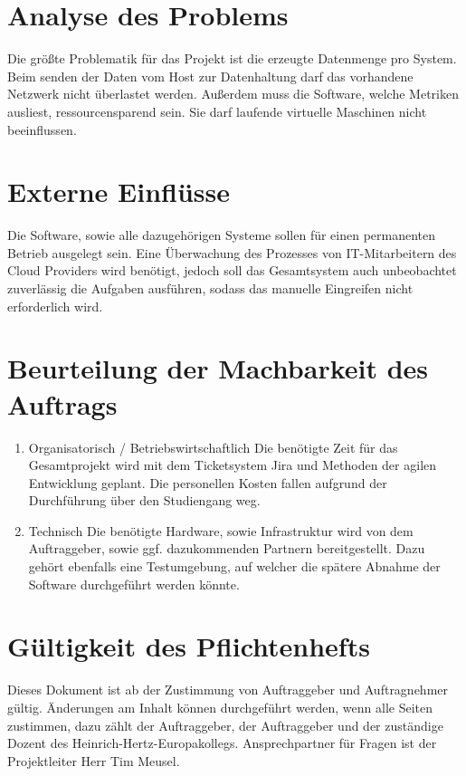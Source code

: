 \section{Analyse des Problems}

Die größte Problematik für das Projekt ist die erzeugte Datenmenge pro System.
Beim senden der Daten vom Host zur Datenhaltung darf das vorhandene Netzwerk
nicht überlastet werden. Außerdem muss die Software, welche Metriken ausliest,
ressourcensparend sein. Sie darf laufende virtuelle Maschinen nicht
beeinflussen.

\section{Externe Einflüsse}

Die Software, sowie alle dazugehörigen Systeme sollen für einen permanenten
Betrieb ausgelegt sein. Eine Überwachung des Prozesses von IT-Mitarbeitern des
Cloud Providers wird benötigt, jedoch soll das Gesamtsystem auch unbeobachtet
zuverlässig die Aufgaben ausführen, sodass das manuelle Eingreifen nicht
erforderlich wird.

\section{Beurteilung der Machbarkeit des Auftrags}

\begin{enumerate}
  \item Organisatorisch / Betriebswirtschaftlich
        Die benötigte Zeit für das Gesamtprojekt wird mit dem Ticketsystem Jira
        und Methoden der agilen Entwicklung geplant. Die personellen Kosten
        fallen aufgrund der Durchführung über den Studiengang weg.

  \item Technisch
        Die benötigte Hardware, sowie Infrastruktur wird von dem Auftraggeber,
        sowie ggf. dazukommenden Partnern bereitgestellt. Dazu gehört ebenfalls
        eine Testumgebung, auf welcher die spätere Abnahme der Software
        durchgeführt werden könnte.
\end{enumerate}

\section{Gültigkeit des Pflichtenhefts}

Dieses Dokument ist ab der Zustimmung von Auftraggeber und Auftragnehmer
gültig. Änderungen am Inhalt können durchgeführt werden, wenn alle Seiten
zustimmen, dazu zählt der Auftraggeber, der Auftraggeber und der zuständige
Dozent des Heinrich-Hertz-Europakollegs. Ansprechpartner für Fragen ist der
Projektleiter Herr Tim Meusel.

